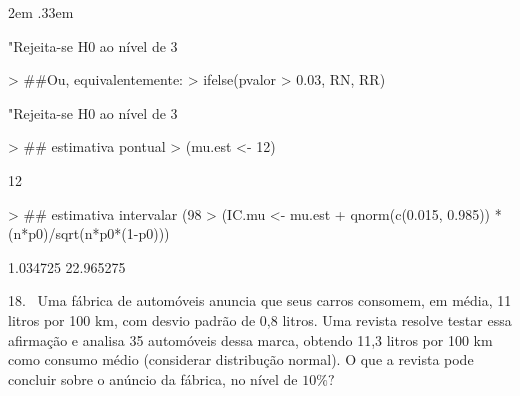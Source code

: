 \documentclass{article}
\newenvironment{ManualExercise}
  {\begin{list}{}{\leftmargin \QuestionIndent
    \partopsep0pt \parsep\parskip \topsep\QuestionBefore
    \itemsep\QuestionBefore \labelwidth2em
    \labelsep.33em
    \usecounter{Question}}}
  {\end{list}}
\begin{document}
\begin{Exercise}
\begin{ManualExercise}
\begin{Schunk}
\begin{Soutput}
[1] "Rejeita-se H0 ao nível de 3%
\end{Soutput}
\begin{Sinput}
> ##Ou, equivalentemente:
> ifelse(pvalor > 0.03, RN, RR)
\end{Sinput}
\begin{Soutput}
[1] "Rejeita-se H0 ao nível de 3%
\end{Soutput}
\begin{Sinput}
> ## estimativa pontual
> (mu.est <- 12)
\end{Sinput}
\begin{Soutput}
[1] 12
\end{Soutput}
\begin{Sinput}
> ## estimativa intervalar (98%
> (IC.mu <- mu.est + qnorm(c(0.015, 0.985)) * (n*p0)/sqrt(n*p0*(1-p0)))
\end{Sinput}
\begin{Soutput}
[1]  1.034725 22.965275
\end{Soutput}
\end{Schunk}

\item[18.~]Uma fábrica de automóveis anuncia que seus carros consomem, em média, 11 litros por 100 km, com desvio padrão de 0,8 litros. Uma revista resolve testar essa afirmação e analisa 35 automóveis dessa marca, obtendo 11,3 litros por 100 km como consumo médio (considerar distribução normal). O que a revista pode concluir sobre o anúncio da fábrica, no nível de $10\%?$


\end{ManualExercise}
\end{Exercise}
\end{document}
